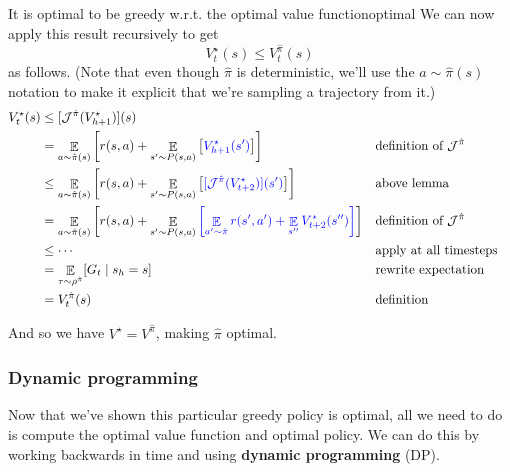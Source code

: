 \documentclass[../main/main]{subfiles}
\begin{document}
\begin{theorem}{It is optimal to be greedy w.r.t. the optimal value function}{optimal}
    We can now apply this result recursively to get
    \[
    V^{\star}_t(s) \le V^{\hat \pi}_t(s)
    \]
    as follows. (Note that even though $\hat \pi$ is deterministic, we'll use the $a \sim \hat \pi(s)$ notation to make it explicit that we're sampling a trajectory from it.)
    \begin{align*}
    V_{t}^{\star}(s) &\le [\mathcal{J}^{\hat \pi}(V_{h+1}^{\star})](s) \\
    &= \mathop{\mathbb{E}}_{a \sim \hat \pi(s)} \left[ r(s, a) + \mathop{\mathbb{E}}_{s' \sim P(s, a)} \left[ {\color{blue} V_{h+1}^{\star}(s')} \right] \right] && \text{definition of } \mathcal{J}^{\hat \pi} \\
    &\le \mathop{\mathbb{E}}_{a \sim \hat \pi(s)} \left[ r(s, a) + \mathop{\mathbb{E}}_{s' \sim P(s, a)} \left[ {\color{blue}[ \mathcal{J}^{\hat \pi} (V_{t+2}^{\star})] (s')} \right] \right] && \text{above lemma} \\
    &= \mathop{\mathbb{E}}_{a \sim \hat \pi(s)} \left[ r(s, a) + \mathop{\mathbb{E}}_{s' \sim P(s, a)}{\color{blue} \left[ \mathop{\mathbb{E}}_{a' \sim \hat \pi}  r(s', a') + \mathop{\mathbb{E}}_{s''} V_{t+2}^{\star}(s'') \right]} \right] && \text{definition of } \mathcal{J}^{\hat \pi} \\
    &\le \cdots && \text{apply at all timesteps} \\
    &= \mathop{\mathbb{E}}_{\tau \sim \rho^{\hat \pi}} [G_{t} \mid s_h = s] && \text{rewrite expectation} \\
    &= V_{t}^{\hat \pi}(s) && \text{definition}
    \end{align*}

    And so we have $V^{\star} = V^{\hat \pi}$, making $\hat \pi$ optimal.
\end{theorem}


\subsubsection{Dynamic programming}

Now that we've shown this particular greedy policy is optimal, all we need to do is compute the optimal value function and optimal policy. We can do this by working backwards in time and using \textbf{dynamic programming} (DP).
\end{document}
